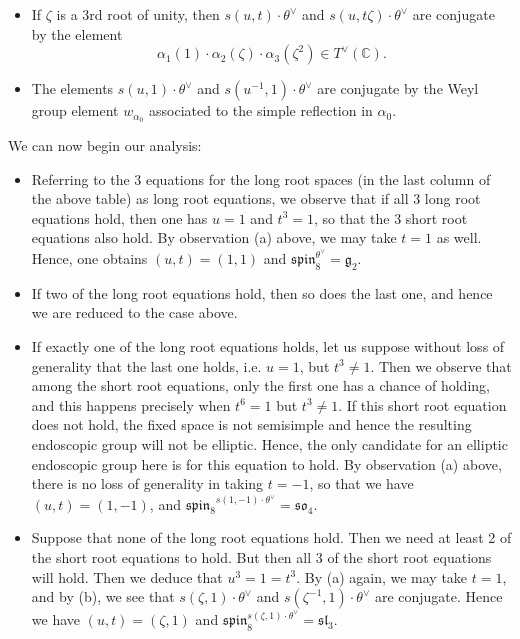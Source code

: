 \documentclass[11pt]{amsart}
\theoremstyle{plain}
\numberwithin{equation}{section}
\newcommand{\C}{\mathbb C}
\def\C{{\bf C}}
\def\C{{\mathbb C}}
\begin{document}
 \begin{itemize}
 \item[(a)] If $\zeta$ is a 3rd root of unity, then $s(u,t) \cdot \theta^{\vee}$ and $s(u,t \zeta)\cdot \theta^{\vee}$ are conjugate by the element
 \[   \alpha_1(1) \cdot \alpha_2(\zeta)  \cdot \alpha_3(\zeta^2)  \in T^{\vee}(\C). \]
 
 \item[(b)] The elements $s(u,1)\cdot \theta^{\vee}$ and $s(u^{-1}, 1)\cdot \theta^{\vee}$ are conjugate by the Weyl group element $w_{\alpha_0}$ associated to the simple reflection in $\alpha_0$. 
  \end{itemize}
 
 \vskip 5pt
 We can now begin our analysis:
 \vskip 5pt
 
 \begin{itemize}
 \item[(i)]  Referring to the 3 equations for the long root spaces (in the last column of the above table) as long root equations, we observe that if all 3 long root equations hold, then one has $ u=1$ and $t^3 =1$, so that the 3 short root equations also hold.  By observation (a) above, we may take $t =1$ as well. Hence, one obtains $(u,t) = (1,1)$ and $\mathfrak{spin}_8^{\theta^{\vee}} = \mathfrak{g}_2$. 
 \vskip 5pt
 
 \item[(ii)]  If two of the long root equations hold, then so does the last one, and hence we are reduced to the case above. 
 \vskip 5pt
 
 \item[(iii)]  If exactly one of the long root equations holds, let us suppose without loss of generality that the last one holds, i.e. $u=1$, but $t^3 \ne 1$. 
 Then we observe that among the short root equations, only the first one has a chance of holding, and this happens precisely when $t^6 =1$ but $t^3 \ne 1$. 
 If this short root equation does not hold, the fixed space is not semisimple and hence the resulting endoscopic group will not be elliptic. Hence, the only candidate for an elliptic endoscopic group here is for this equation to hold. By observation (a) above, there is no loss of generality in taking $t = -1$, so that we have $(u,t) = (1,-1)$, and $\mathfrak{spin_8}^{s(1,-1) \cdot \theta^{\vee}} =\mathfrak{so}_4$. 
 \vskip 5pt
 
 \item[(iv)]  Suppose that none of the long root equations hold. Then we need at least 2 of the short root equations to hold. But then all 3 of the short root equations will hold. Then we deduce that $u^3 = 1 = t^3$. By (a) again, we may take $t =1$, and by (b), we see that $s(\zeta,1) \cdot \theta^{\vee}$ and $s(\zeta^{-1}, 1) \cdot \theta^{\vee}$ are conjugate. Hence we have $(u,t) = (\zeta, 1)$ and $\mathfrak{spin}_8^{s(\zeta,1) \cdot \theta^{\vee}} = \mathfrak{sl_3}$. 
 \end{itemize}
 
\end{document}
